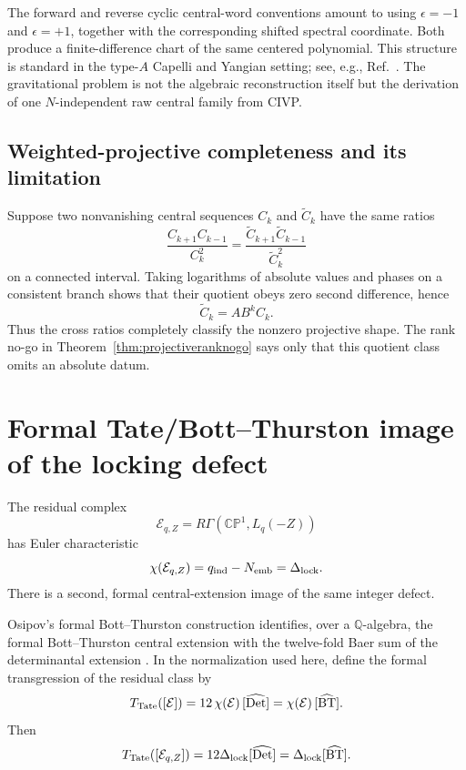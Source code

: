 \documentclass[aps,prd,preprint,nofootinbib,superscriptaddress]{revtex4-2}
\theoremstyle{definition}
\theoremstyle{remark}
\newcommand{\cE}{\mathcal E}
\newcommand{\CP}{\mathbb{CP}}
\begin{document}
The forward and reverse cyclic central-word conventions amount to using
$\epsilon=-1$ and $\epsilon=+1$, together with the corresponding shifted
spectral coordinate.  Both produce a finite-difference chart of the same
centered polynomial.  This structure is standard in the type-$A$ Capelli and
Yangian setting; see, e.g., Ref.~\cite{Molev2003}.  The gravitational problem
is not the algebraic reconstruction itself but the derivation of one
$N$-independent raw central family from CIVP.

\subsection{Weighted-projective completeness and its limitation}

Suppose two nonvanishing central sequences $C_k$ and $\widetilde C_k$ have
the same ratios
\begin{equation}
\frac{C_{k+1}C_{k-1}}{C_k^2}
=
\frac{\widetilde C_{k+1}\widetilde C_{k-1}}{\widetilde C_k^2}
\end{equation}
on a connected interval.  Taking logarithms of absolute values and phases on
a consistent branch shows that their quotient obeys zero second difference,
hence
\begin{equation}
\widetilde C_k=A B^k C_k.
\end{equation}
Thus the cross ratios completely classify the nonzero projective shape.  The
rank no-go in Theorem~\ref{thm:projectiveranknogo} says only that this quotient
class omits an absolute datum.

\section{Formal Tate/Bott--Thurston image of the locking defect}
\label{app:tate}

The residual complex
\begin{equation}
\cE_{q,Z}
=
R\Gamma(\CP^1,L_q(-Z))
\end{equation}
has Euler characteristic
\begin{equation}
\chi(\cE_{q,Z})
=
q_{\rm ind}-N_{\rm emb}
=
\Delta_{\rm lock}.
\label{eq:tateeuler}
\end{equation}
There is a second, formal central-extension image of the same integer defect.

Osipov's formal Bott--Thurston construction identifies, over a
$\mathbb Q$-algebra, the formal Bott--Thurston central extension with the
twelve-fold Baer sum of the determinantal extension
\cite{Osipov2022}.  In the normalization used here, define the formal
transgression of the residual class by
\begin{equation}
T_{\rm Tate}([\cE])
=
12\,\chi(\cE)\,[\widehat{\rm Det}]
=
\chi(\cE)\,[\widehat{\rm BT}].
\label{eq:Tate}
\end{equation}
Then
\begin{equation}
T_{\rm Tate}([\cE_{q,Z}])
=
12\Delta_{\rm lock}[\widehat{\rm Det}]
=
\Delta_{\rm lock}[\widehat{\rm BT}].
\label{eq:Tatelock}
\end{equation}
\end{document}
